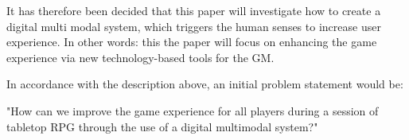It has therefore been decided that this paper will investigate how to create a digital multi modal system, which triggers the human senses to increase user experience. In other words: this the paper will focus on enhancing the game experience via new technology-based tools for the GM. 

In accordance with the description above, an initial problem statement would be:

"How can we improve the game experience for all players during a session of tabletop RPG through the use of a digital multimodal system?"  
